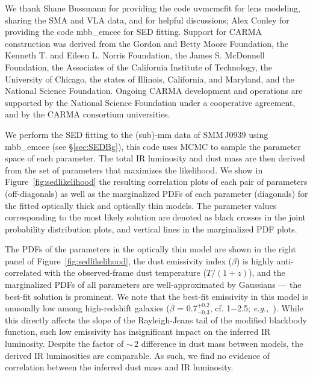 \documentclass[twocolumn,apj,numberedappendix]{emulateapj}
\newcommand{\eg}{{\sl e.g.,~}}
\begin{document}
\acknowledgments
We thank Shane Bussmann for providing the code {\sc uvmcmcfit} for lens modeling, sharing the SMA and VLA data, and for helpful discussions; Alex Conley for providing the code {\sc mbb\_emcee} for SED fitting. 
Support for CARMA construction was derived from the
Gordon and Betty Moore Foundation, the Kenneth T. and Eileen
L. Norris Foundation, the James S. McDonnell Foundation, the
Associates of the California Institute of Technology, the University
of Chicago, the states of Illinois, California, and Maryland,
and the National Science Foundation. 
Ongoing CARMA development
and operations are supported by the National Science
Foundation under a cooperative agreement, and by the CARMA
consortium universities.
\newpage



\appendix
We perform the SED fitting to the (sub)-mm data of SMM\,J0939 using {\sc mbb\_emcee} (see \S \ref{sec:SEDBg}), this code uses MCMC to sample the parameter space of each parameter. The total IR luminosity and dust mass are then derived from the set of parameters that maximizes the likelihood.
We show in Figure~\ref{fig:sedlikelihood} the resulting correlation plots of each pair of parameters (off-diagonals) as well as the marginalized PDFs of each parameter (diagonals) for the fitted optically thick and optically thin models.
The parameter values corresponding to the most likely solution are denoted as black crosses in the joint probability distribution plots, and vertical lines in the marginalized PDF plots. \par

The PDFs of the parameters in the optically thin model are shown in the right panel of Figure~\ref{fig:sedlikelihood}, the dust emissivity index ($\beta$) is highly anti-correlated with the observed-frame dust temperature ($T/(1+z)$), and the marginalized PDFs of all parameters are well-approximated by Gaussians --- the best-fit solution is prominent.
We note that the best-fit emissivity in this model is unusually low among high-redshift galaxies ($\beta$ = 0.7$^{+0.2}_{-0.3}$, cf. 1$-$2.5; \eg \citealt[][and references therein]{Casey12a}). While this directly affects the slope of the Rayleigh-Jeans tail of the modified blackbody function, such low emissivity has insignificant impact on the inferred IR luminosity.
Despite the factor of $\sim$\,2 difference
in dust mass
between models, the derived IR luminosities are comparable. As such, we find no evidence of correlation between the inferred dust mass and IR luminosity. 
\end{document}
